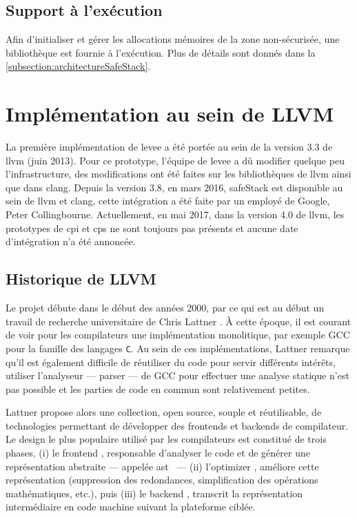 \subsection{Support à l'exécution}

Afin d'initialiser et gérer les allocations mémoires de la zone non-sécurisée, une bibliothèque est fournie à l'exécution. Plus de détails sont donnés dans la \autoref{subsection:architectureSafeStack}.

\section{Implémentation au sein de LLVM}

%

La première implémentation de \gls{levee} a été portée au sein de la version 3.3 de \gls{llvm} (juin 2013). Pour ce prototype, l'équipe de \gls{levee} a dû modifier quelque peu l'infrastructure, des modifications ont été faites sur les bibliothèques de \gls{llvm} ainsi que dans \gls{clang}. Depuis la version 3.8, en mars 2016, \og \gls{safeStack} \fg est disponible au sein de \gls{llvm} et \gls{clang}, cette intégration a été faite par un employé de Google, Peter Collingbourne. Actuellement, en mai 2017, dans la version 4.0 de \gls{llvm}, les prototypes de \gls{cpi} et \gls{cps} ne sont toujours pas présents et aucune date d'intégration n'a été annoncée.

\subsection{Historique de LLVM}

Le projet débute dans le début des années 2000, par ce qui est au début un travail de recherche universitaire de Chris Lattner \cite{ChrisLattner}. À cette époque, il est courant de voir pour les compilateurs une implémentation monolitique, par exemple GCC pour la famille des langages \texttt{C}. Au sein de ces implémentations, Lattner remarque qu'il est également difficile de réutiliser du code pour servir différents intérêts, utiliser l'analyseur --- \og parser \fg --- de GCC pour effectuer une analyse statique n'est pas possible et les parties de code en commun sont relativement petites.

Lattner propose alors une collection, open source, souple et réutilisable, de technologies permettant de développer des \og frontends \fg et \og backends \fg de compilateur. Le design le plus populaire utilisé par les compilateurs est constitué de trois phases, (i) le \og frontend \fg, responsable d'analyser le code et de générer une représentation abstraite --- appelée \og \gls{ast} \fg \ --- (ii) l'\og optimizer \fg, améliore cette représentation (suppression des redondances, simplification des opérations mathématiques, etc.), puis (iii) le \og backend \fg, transcrit la représentation intermédiaire en code machine suivant la plateforme ciblée.

